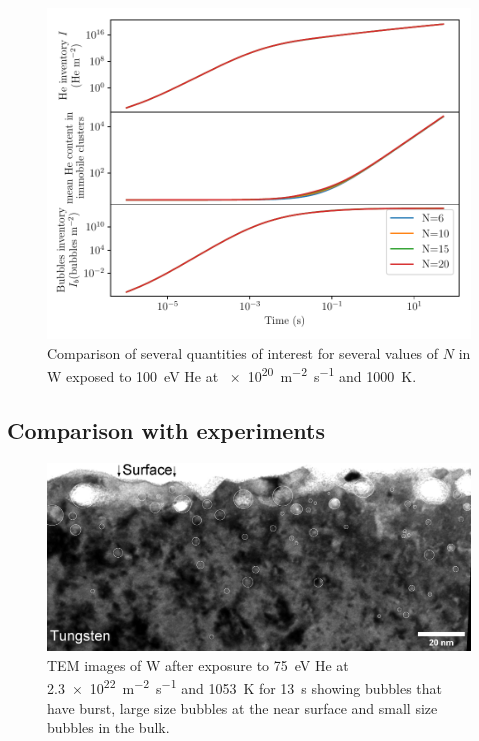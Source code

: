 \begin{figure} [h]
    \centering
    \includegraphics[width=\linewidth]{Figures/Chapter4/varying_N.pdf}
    \caption{Comparison of several quantities of interest for several values of $N$ in W exposed to \SI{100}{eV} He at \SI{e20}{m^{-2}.s^{-1}} and \SI{1000}{K}.}
\end{figure}

\subsection{Comparison with experiments}

\begin{figure} [h]
    \centering
    \includegraphics[width=\linewidth]{Figures/Chapter4/bubbles_tem.jpg}
    \caption{TEM images of W after exposure to \SI{75}{eV} He at \SI{2.3e22}{m^{-2}.s^{-1}} and \SI{1053}{K} for \SI{13}{s} showing bubbles that have burst, large size bubbles at the near surface and small size bubbles in the bulk.}
\end{figure}

